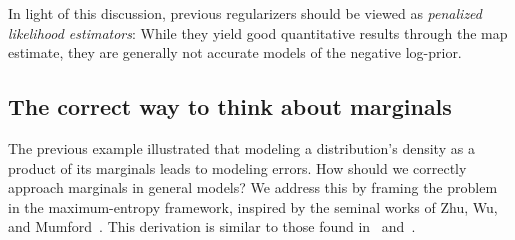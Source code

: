 In light of this discussion, previous regularizers should be viewed as \emph{penalized likelihood estimators}:
While they yield good quantitative results through the \gls{map} estimate, they are generally not accurate models of the negative log-prior.
\subsection{The correct way to think about marginals}%
\label{ssec:correct way to think about marginals}
The previous example illustrated that modeling a distribution's density as a product of its marginals leads to modeling errors.
How should we correctly approach marginals in general models?
We address this by framing the problem in the maximum-entropy framework, inspired by the seminal works of Zhu, Wu, and Mumford~\cite{zhu_filters_1998,zhu_minimax_1997}.
This derivation is similar to those found in~\cite[section 3.1]{wainwright_graphical_2008} and~\cite[section 12.1]{Cover2005}.


